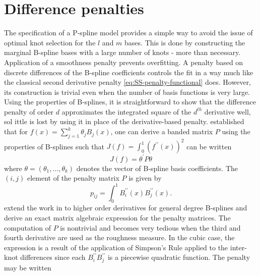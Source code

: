
\section{Difference penalties}

The specification of a P-spline model provides a simple way to avoid the issue of optimal knot selection for the $l$ and $m$ bases. This is done by constructing the marginal B-spline bases with a large number of knots - more than necessary. Application of a smoothness penalty prevents overfitting. A penalty based on discrete differences of the B-spline coefficients controls the fit in a way much like the classical second derivative penalty \eqref{eq:SS-penalty-functional} does. However, its construction is trivial even when the number of basis functions is very large. Using the properties of B-splines, it is straightforward to show that the difference penalty of order $d$ approximates the integrated square of the $d^{th}$ derivative well, sol ittle is lost by using it in place of the derivative-based penalty. \cite{o1986statistical} established that for $f\left(x\right) = \sum\limits_{j=1}^k \theta_j B_j\left(x\right)$, one can derive a banded matrix $P$ using the properties of B-splines such that $J\left(f\right) = \int_0^1 \left( f^{\prime \prime}\left(x\right)\right)^2$ can be written
 \[
J\left(f\right) = \theta^\prime P \theta
 \] 
\noindent
where $\theta = \left(\theta_1,\dots, \theta_k\right)$ denotes the vector of B-spline basis coefficients. The $\left(i,j\right)$ element of the penalty matrix $P$ is given by
 \[
 p_{ij} = \int_0^1 B_i^{\prime \prime}\left(x\right) B_j^{\prime \prime}\left(x\right).
 \]
\cite{wand2008semiparametric} extend the work in \cite{o1986statistical} to higher order derivatives for general degree B-splines and derive an exact matrix algebraic expression for the penalty matrices.  The computation of $P$ is nontrivial and becomes very tedious when the third and fourth derivative are used as the roughness measure. In the cubic case, the expression is a result of the application of Simpson's Rule applied to the inter-knot differences since each $B_i^{\prime \prime} B_j^{\prime \prime}$ is a piecewise quadratic function. The penalty may be written
